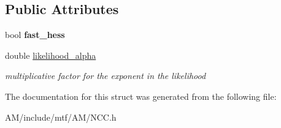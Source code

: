 \subsection*{Public Attributes}
\begin{DoxyCompactItemize}
\item 
\hypertarget{structNCCParams_ad299248aa9607101c205a466bff14cb0}{bool {\bfseries fast\-\_\-hess}}\label{structNCCParams_ad299248aa9607101c205a466bff14cb0}

\item 
\hypertarget{structNCCParams_acd8c9b4bbdac61aec95c22ee1483bc15}{double \hyperlink{structNCCParams_acd8c9b4bbdac61aec95c22ee1483bc15}{likelihood\-\_\-alpha}}\label{structNCCParams_acd8c9b4bbdac61aec95c22ee1483bc15}

\begin{DoxyCompactList}\small\item\em multiplicative factor for the exponent in the likelihood \end{DoxyCompactList}\end{DoxyCompactItemize}


The documentation for this struct was generated from the following file\-:\begin{DoxyCompactItemize}
\item 
A\-M/include/mtf/\-A\-M/N\-C\-C.\-h\end{DoxyCompactItemize}
